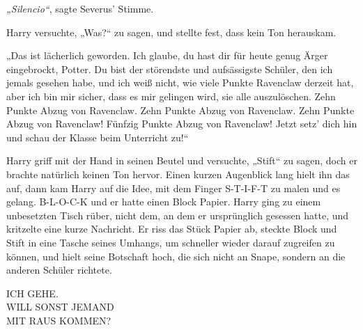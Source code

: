 \emph{„Silencio“}, sagte Severus’ Stimme. 

Harry versuchte, „Was?“ zu sagen, und stellte fest, dass kein Ton herauskam. 

„Das ist lächerlich geworden. Ich glaube, du hast dir für heute genug Ärger eingebrockt, Potter. Du bist der störendste und aufsässigste Schüler, den ich jemals gesehen habe, und ich weiß nicht, wie viele Punkte Ravenclaw derzeit hat, aber ich bin mir sicher, dass es mir gelingen wird, sie alle auszulöschen. Zehn Punkte Abzug von Ravenclaw. Zehn Punkte Abzug von Ravenclaw. Zehn Punkte Abzug von Ravenclaw! Fünfzig Punkte Abzug von Ravenclaw! Jetzt setz’ dich hin und schau der Klasse beim Unterricht zu!“ 

Harry griff mit der Hand in seinen Beutel und versuchte, „Stift“ zu sagen, doch er brachte natürlich keinen Ton hervor. Einen kurzen Augenblick lang hielt ihn das auf, dann kam Harry auf die Idee, mit dem Finger S-T-I-F-T zu malen und es gelang. B-L-O-C-K und er hatte einen Block Papier. Harry ging zu einem unbesetzten Tisch rüber, nicht dem, an dem er ursprünglich gesessen hatte, und kritzelte eine kurze Nachricht. Er riss das Stück Papier ab, steckte Block und Stift in eine Tasche seines Umhangs, um schneller wieder darauf zugreifen zu können, und hielt seine Botschaft hoch, die sich nicht an Snape, sondern an die anderen Schüler richtete. 

\begin{writtenNote}
ICH GEHE.\\
WILL SONST JEMAND\\
MIT RAUS KOMMEN?
\end{writtenNote}

